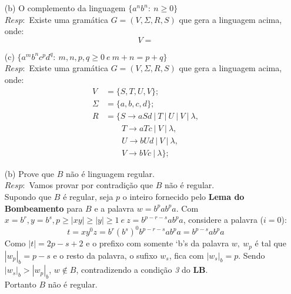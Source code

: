 \documentclass{homework}
\begin{document}
\pagestyle{fancy}

	\begin{itemize}
		\item[(b)] O complemento da linguagem $\{a^n b^n:\ n \geq 0\}$\\
		$Resp:$ Existe uma gramática $G = (V, \Sigma, R, S)$ que gera a linguagem acima, onde: %
		\[V = \]
		\item[(c)] $\{a^m b^n c^p d^q:\ m,n,p,q \geq 0\ e\ m + n = p + q\}$\\
		$Resp:$ Existe uma gramática $G = (V, \Sigma, R, S)$ que gera a linguagem acima, onde: %
		\begin{align*}
			V &= \{S, T, U, V\};\\
			\Sigma &= \{a,b,c,d\};\\
			R &= \{S \rightarrow aSd\ |\ T\ |\ U\ |\ V\ |\ \lambda,\\
				&\qquad	T \rightarrow aTc\ |\ V\ |\ \lambda, \\
				&\qquad	U \rightarrow bUd\ |\ V\ |\ \lambda, \\
				&\qquad	V \rightarrow bVc\ |\ \lambda\};
		\end{align*}
	\end{itemize}
\pagebreak

	\begin{enumerate}
		\item[(b)] Prove que $B$ não é linguagem regular.\\
		$Resp:$ Vamos provar por contradição que $B$ não é regular.\\
			Supondo que $B$ é regular, seja $p$ o inteiro fornecido pelo \textbf{Lema do Bombeamento} para $B$ e a palavra $w = b^pab^pa$. Com $x = b^r, y = b^{s}, p \geq |xy| \geq |y| \geq 1\ e\ z = b^{p-r-s}ab^pa$, considere a palavra ($i = 0$):
			\[t = xy^0z = b^r(b^s)^0b^{p-r-s}ab^pa = b^{p-s}ab^pa\]
			Como $|t|=2p-s+2$ e o prefixo com somente `b's da palavra $w,\ w_p$ é tal que $|w_p|_b = p - s$ e o resto da palavra, o sufixo $w_s$, fica com $|w_s|_b = p$. Sendo $|w_s|_b > |w_p|_b$, $w \notin B$, contradizendo a condição \textit{3} do \textbf{LB}.\\
			Portanto $B$ não é regular.
	\end{enumerate}
	
\end{document}
